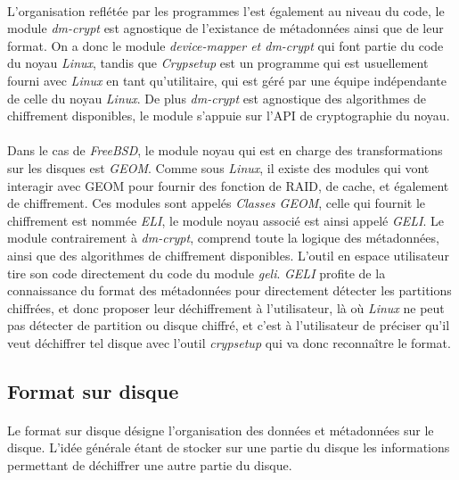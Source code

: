 \paragraph{}
L'organisation reflétée par les programmes l'est également au niveau du code,
le module {\em dm-crypt} est agnostique de l'existance de métadonnées ainsi 
que de leur format. On a donc le module {\em device-mapper \em et \em dm-crypt}
qui font partie du code du noyau {\em Linux}, tandis que {\em Crypsetup} est un 
programme qui est usuellement fourni avec {\em Linux} en tant qu'utilitaire, 
qui est géré par une équipe indépendante de celle du noyau {\em Linux}. De plus 
{\em dm-crypt} est agnostique des algorithmes de chiffrement disponibles,
le module s'appuie sur l'API de cryptographie du noyau.

\paragraph{}
Dans le cas de {\em FreeBSD}, le module noyau qui est en charge des
transformations sur les disques est {\em GEOM}. Comme sous {\em Linux}, 
il existe des modules qui vont interagir avec GEOM pour fournir des fonction 
de RAID, de cache, et également de chiffrement. 
Ces modules sont appelés {\em Classes GEOM}, 
celle qui fournit le chiffrement est nommée {\em ELI}, le module noyau associé 
est ainsi appelé {\em GELI}. Le module contrairement à {\em dm-crypt}, 
comprend toute la logique des métadonnées, ainsi que des algorithmes de 
chiffrement disponibles. L'outil en espace utilisateur tire son code
directement du code du module {\em geli}. {\em GELI} profite de la 
connaissance du format des métadonnées pour directement détecter les 
partitions chiffrées, et donc proposer leur déchiffrement à l'utilisateur, 
là où {\em Linux} ne peut pas détecter de
partition ou disque chiffré, et c'est à l'utilisateur de préciser qu'il veut 
déchiffrer tel disque avec l'outil {\em crypsetup} qui va donc reconnaître le 
format.


\subsection{Format sur disque}
\paragraph{}
Le format sur disque désigne l'organisation des données et métadonnées sur le 
disque. L'idée générale étant de stocker sur une partie du disque les 
informations permettant de déchiffrer une autre partie du disque.
